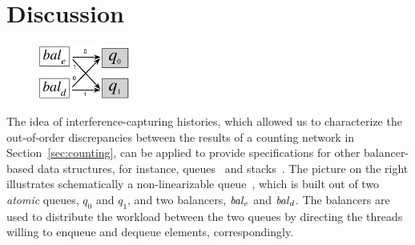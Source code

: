 \section{Discussion}
\label{sec:discussion}

%



%
\begin{figure}   
\centering 
\includegraphics[width=3.0cm]{queue.pdf} 
\end{figure}
%
The idea of interference-capturing histories, which allowed us to
characterize the out-of-order discrepancies between the results of a
counting network in Section~\ref{sec:counting},
%
can be applied to provide specifications for other
balancer-based data structures, for instance,
queues~\cite{Derrick-al:FM14} and
stacks~\cite{Jagadeesan-Riely:ICALP14}.
%
The picture on the right illustrates schematically a non-linearizable
queue~\cite{Derrick-al:FM14}, which is built out of two \emph{atomic}
queues, $q_0$ and $q_1$, and two balancers, $\mathit{bal}_e$ and $\mathit{bal}_d$.
The balancers are used to distribute the workload between the two
queues by directing the threads willing to enqueue and dequeue
elements, correspondingly.


